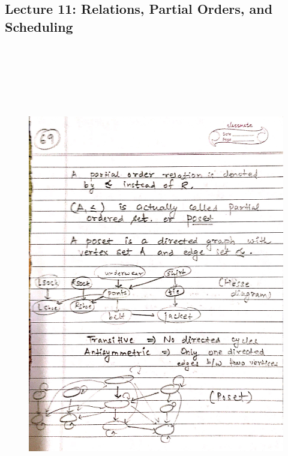 \newpage
{\color{black} \subsection*{Lecture 11: Relations, Partial Orders, and Scheduling}}
\begin{figure}[H]
    \centering
    \includegraphics[width=16cm, height=21cm]{"./MIT-6.042J/MIT-6042J-069"}
\end{figure}

